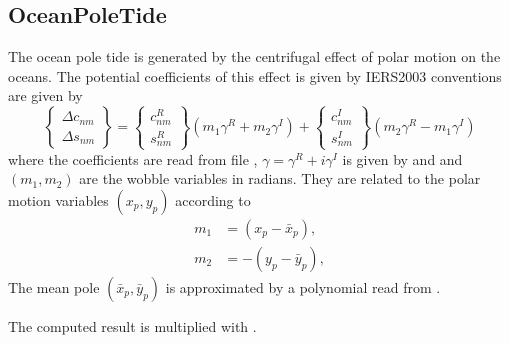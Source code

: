\subsection{OceanPoleTide}\label{tidesType:oceanPoleTide}
The ocean pole tide is generated by the centrifugal effect of polar motion on the oceans.
The potential coefficients of this effect is given by
IERS2003 conventions are given by
\begin{equation}
\begin{Bmatrix}
\Delta c_{nm}  \\
\Delta s_{nm}
\end{Bmatrix}=
\begin{Bmatrix}
c_{nm}^R  \\
s_{nm}^R
\end{Bmatrix}
(m_1\gamma^R+m_2\gamma^I)+
\begin{Bmatrix}
c_{nm}^I  \\
s_{nm}^I
\end{Bmatrix}
(m_2\gamma^R-m_1\gamma^I)
\end{equation}
where the coefficients are read from file ,
$\gamma=\gamma^R+i\gamma^I$ is given by  and
 and $(m_1,m_2)$ are the wobble variables in radians.
They are related to the polar motion variables $(x_p,y_p)$ according to
\begin{equation}
\begin{split}
m_1 &=  (x_p - \bar{x}_p), \\
m_2 &= -(y_p - \bar{y}_p),
\end{split}
\end{equation}
The mean pole $(\bar{x}_p, \bar{y}_p)$ is approximated by a polynomial
read from .

The computed result is multiplied with .


